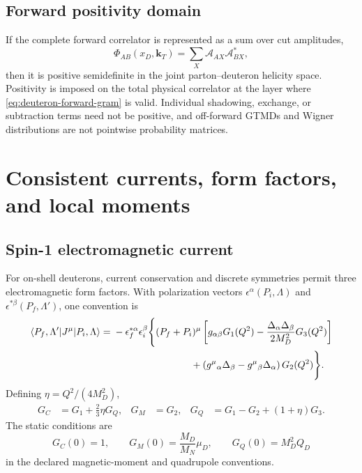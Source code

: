 \documentclass[11pt]{article}
\newcommand{\kT}{\bm{k}_{T}}
\newcommand{\cA}{\mathcal A}
\begin{document}
\subsection{Forward positivity domain}

If the complete forward correlator is represented as a sum over cut
amplitudes,
\begin{equation}
 \Phi_{AB}(x_D,\kT)
 =\sum_X \cA_{AX}\cA_{BX}^*,
\label{eq:deuteron-forward-gram}
\end{equation}
then it is positive semidefinite in the joint parton--deuteron helicity
space.  Positivity is imposed on the total physical correlator at the layer
where \cref{eq:deuteron-forward-gram} is valid.  Individual shadowing,
exchange, or subtraction terms need not be positive, and off-forward GTMDs
and Wigner distributions are not pointwise probability matrices.

\section{Consistent currents, form factors, and local moments}
\label{sec:currents-formfactors}

\subsection{Spin-1 electromagnetic current}

For on-shell deuterons, current conservation and discrete symmetries permit
three electromagnetic form factors.  With polarization vectors
\(\epsilon^\alpha(P_i,\Lambda)\) and
\(\epsilon^{*\beta}(P_f,\Lambda')\), one convention is
\begin{align}
 \langle P_f,\Lambda'|J^\mu|P_i,\Lambda\rangle
 ={}&-\epsilon_f^{*\alpha}\epsilon_i^\beta
 \Bigg\{
 (P_f+P_i)^\mu
 \left[
 g_{\alpha\beta}G_1(Q^2)
 -\frac{\Delta_\alpha\Delta_\beta}{2M_D^2}G_3(Q^2)
 \right]
 \notag\\
 &\hspace{28mm}
 +\left(g^\mu{}_{\alpha}\Delta_\beta
 -g^\mu{}_{\beta}\Delta_\alpha\right)G_2(Q^2)
 \Bigg\}.
\label{eq:spin1-current-decomposition}
\end{align}
Defining \(\eta=Q^2/(4M_D^2)\),
\begin{align}
 G_C&=G_1+\frac23\eta G_Q,
 &
 G_M&=G_2,
 &
 G_Q&=G_1-G_2+(1+\eta)G_3.
\label{eq:physical-deuteron-formfactors}
\end{align}
The static conditions are
\begin{equation}
 G_C(0)=1,
 \qquad
 G_M(0)=\frac{M_D}{M_N}\mu_D,
 \qquad
 G_Q(0)=M_D^2Q_D
\label{eq:static-formfactor-normalization}
\end{equation}
in the declared magnetic-moment and quadrupole conventions.
\end{document}
